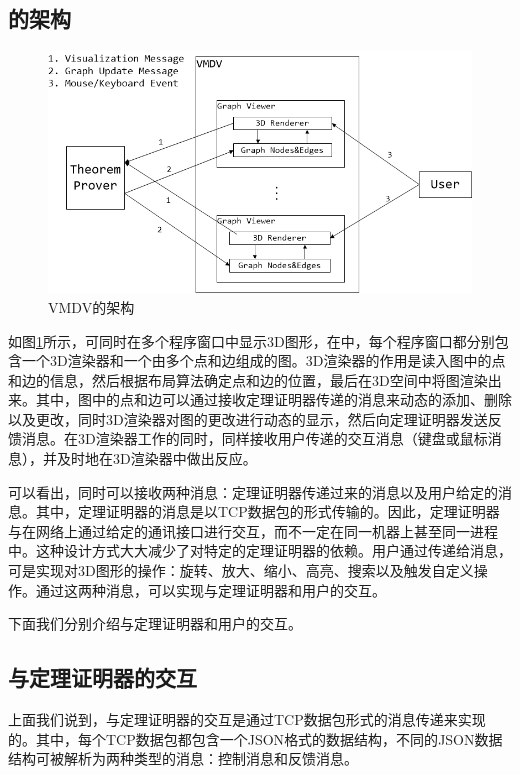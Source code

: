 \subsection{的架构}
\begin{figure}[!h]
	\scriptsize
	\centering
	\includegraphics[width=12cm]{./Img/architecture.png}
	\caption{\textsf{VMDV}的架构}
	\label{fig:architecture}
\end{figure}
如图\ref{fig:architecture}所示，可同时在多个程序窗口中显示3D图形，在中，每个程序窗口都分别包含一个3D渲染器和一个由多个点和边组成的图。3D渲染器的作用是读入图中的点和边的信息，然后根据布局算法确定点和边的位置，最后在3D空间中将图渲染出来。其中，图中的点和边可以通过接收定理证明器传递的消息来动态的添加、删除以及更改，同时3D渲染器对图的更改进行动态的显示，然后向定理证明器发送反馈消息。在3D渲染器工作的同时，同样接收用户传递的交互消息（键盘或鼠标消息），并及时地在3D渲染器中做出反应。

可以看出，同时可以接收两种消息：定理证明器传递过来的消息以及用户给定的消息。其中，定理证明器的消息是以\textsf{TCP}数据包的形式传输的。因此，定理证明器与在网络上通过给定的通讯接口进行交互，而不一定在同一机器上甚至同一进程中。这种设计方式大大减少了对特定的定理证明器的依赖。用户通过传递给消息，可是实现对3D图形的操作：旋转、放大、缩小、高亮、搜索以及触发自定义操作。通过这两种消息，可以实现与定理证明器和用户的交互。

下面我们分别介绍与定理证明器和用户的交互。
\subsection{与定理证明器的交互}
上面我们说到，与定理证明器的交互是通过\textsf{TCP}数据包形式的消息传递来实现的。其中，每个\textsf{TCP}数据包都包含一个\textsf{JSON}格式的数据结构，不同的\textsf{JSON}数据结构可被解析为两种类型的消息：控制消息和反馈消息。

